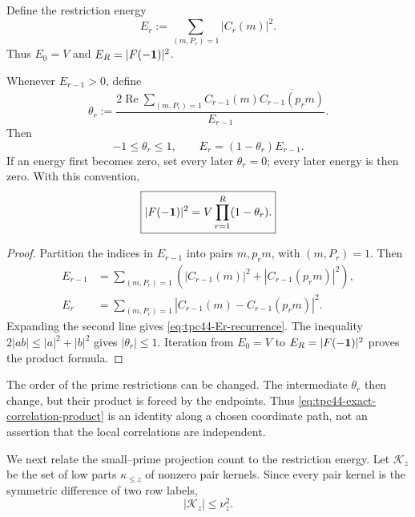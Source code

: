 Define the restriction energy
\begin{equation}
 E_r:=\sum_{(m,P_r)=1}|C_r(m)|^2.
 \label{eq:tpc44-Er}
\end{equation}
Thus \(E_0=V\) and \(E_R=|F(-\mathbf 1)|^2\).

\begin{theorem}
\label{thm:tpc44-correlation-product}
Whenever \(E_{r-1}>0\), define
\begin{equation}
 \theta_r:=
 \frac{
  2\operatorname{Re}
  \displaystyle\sum_{(m,P_r)=1}
  C_{r-1}(m)\overline{C_{r-1}(p_rm)}
 }{E_{r-1}}.
 \label{eq:tpc44-theta}
\end{equation}
Then
\begin{equation}
 -1\le\theta_r\le1,
 \qquad
 E_r=(1-\theta_r)E_{r-1}.
 \label{eq:tpc44-Er-recurrence}
\end{equation}
If an energy first becomes zero, set every later \(\theta_r=0\); every
later energy is then zero.  With this convention,
\begin{equation}
 \boxed{
 |F(-\mathbf 1)|^2
 =V\prod_{r=1}^{R}(1-\theta_r).}
 \label{eq:tpc44-exact-correlation-product}
\end{equation}
\end{theorem}

\begin{proof}
Partition the indices in \(E_{r-1}\) into pairs \(m,p_rm\), with
\((m,P_r)=1\).  Then
\begin{align}
 E_{r-1}
 &=\sum_{(m,P_r)=1}
 \left(
  |C_{r-1}(m)|^2+|C_{r-1}(p_rm)|^2
 \right),
 \label{eq:tpc44-paired-old-energy}\\
 E_r
 &=\sum_{(m,P_r)=1}
 |C_{r-1}(m)-C_{r-1}(p_rm)|^2.
 \label{eq:tpc44-paired-new-energy}
\end{align}
Expanding the second line gives \eqref{eq:tpc44-Er-recurrence}.  The
inequality
\(
 2|ab|\le|a|^2+|b|^2
\)
gives \(|\theta_r|\le1\).  Iteration from \(E_0=V\) to
\(E_R=|F(-\mathbf 1)|^2\) proves the product formula.
\end{proof}

The order of the prime restrictions can be changed.  The intermediate
\(\theta_r\) then change, but their product is forced by the endpoints.
Thus \eqref{eq:tpc44-exact-correlation-product} is an identity along a
chosen coordinate path, not an assertion that the local correlations
are independent.

We next relate the small--prime projection count to the restriction
energy.  Let \(\mathcal K_z\) be the set of low parts
\(\kappa_{\le z}\) of nonzero pair kernels.  Since every pair kernel is
the symmetric difference of two row labels,
\begin{equation}
 |\mathcal K_z|\le\nu_z^2.
 \label{eq:tpc44-kernel-projection-count}
\end{equation}

